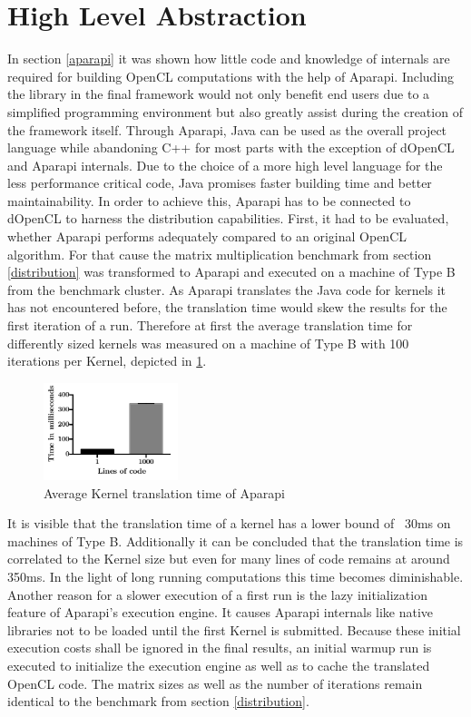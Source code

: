 \section{High Level Abstraction}
\label{abstraction}

In section \ref{aparapi} it was shown how little code and knowledge of internals are required for building OpenCL computations with the help of Aparapi. Including the library in the final framework would not only benefit end users due to a simplified programming environment but also greatly assist during the creation of the framework itself. Through Aparapi, Java can be used as the overall project language while abandoning C++ for most parts with the exception of dOpenCL and Aparapi internals. Due to the choice of a more high level language for the less performance critical code, Java promises faster building time and better maintainability. In order to achieve this, Aparapi has to be connected to dOpenCL to harness the distribution capabilities. First, it had to be evaluated, whether Aparapi performs adequately compared to an original OpenCL algorithm. For that cause the matrix multiplication benchmark from section \ref{distribution} was transformed to Aparapi and executed on a machine of Type B from the benchmark cluster. As Aparapi translates the Java code for kernels it has not encountered before, the translation time would skew the results for the first iteration of a run. Therefore at first the average translation time for differently sized kernels was measured on a machine of Type B with 100 iterations per Kernel, depicted in \ref{img:aparapi_translation}.

\begin{figure}[!htb]
	\includegraphics[width=0.35\textwidth]{images/aparapi_translation.pdf}
	\centering
	\caption{Average Kernel translation time of Aparapi}
	\label{img:aparapi_translation}
\end{figure}

It is visible that the translation time of a kernel has a lower bound of ~30ms on machines of Type B. Additionally it can be concluded that the translation time is correlated to the Kernel size but even for many lines of code remains at around 350ms. In the light of long running computations this time becomes diminishable. Another reason for a slower execution of a first run is the lazy initialization feature of Aparapi's execution engine. It causes Aparapi internals like native libraries not to be loaded until the first Kernel is submitted. Because these initial execution costs shall be ignored in the final results, an initial warmup run is executed to initialize the execution engine as well as to cache the translated OpenCL code. The matrix sizes as well as the number of iterations remain identical to the benchmark from section \ref{distribution}.

